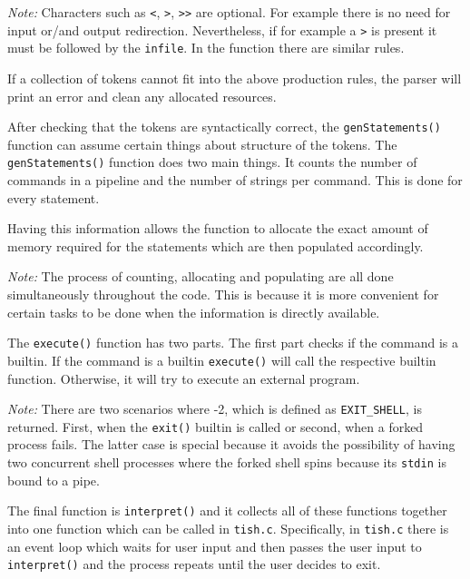 \documentclass[12pt]{article}
\begin{document}
\textit{Note:} Characters such as \texttt{\textless},
\texttt{\textgreater}, \texttt{{\textgreater}{\textgreater}} are
optional. For example there is no need for input or/and output
redirection. Nevertheless, if for example a
\texttt{\textgreater} is present it must be followed by the
\texttt{infile}. In the function there are similar rules.

If a collection of tokens cannot fit into the above production
rules, the parser will print an error and clean any allocated
resources.

After checking that the tokens are syntactically correct, the
\texttt{genStatements()} function can assume certain things
about structure of the tokens. The \texttt{genStatements()}
function does two main things. It counts the number of commands
in a pipeline and the number of strings per command. This is
done for every statement.

Having this information allows the function to allocate the
exact amount of memory required for the statements which are
then populated accordingly.

\textit{Note:} The process of counting, allocating and
populating are all done simultaneously throughout the code. This
is because it is more convenient for certain tasks to be done
when the information is directly available.



The \texttt{execute()} function has two parts. The first part
checks if the command is a builtin. If the command is a builtin
\texttt{execute()} will call the respective builtin function.
Otherwise, it will try to execute an external program.

\textit{Note:} There are two scenarios where -2, which is
defined as \texttt{EXIT\_SHELL}, is returned. First, when the
\texttt{exit()} builtin is called or second, when a forked
process fails. The latter case is special because it avoids the
possibility of having two concurrent shell processes where the
forked shell spins because its \texttt{stdin} is bound to a
pipe.

\newpage



The final function is \texttt{interpret()} and it collects all
of these functions together into one function which can be
called in \texttt{tish.c}. Specifically, in \texttt{tish.c}
there is an event loop which waits for user input and then
passes the user input to \texttt{interpret()} and the process
repeats until the user decides to exit.
\end{document}
